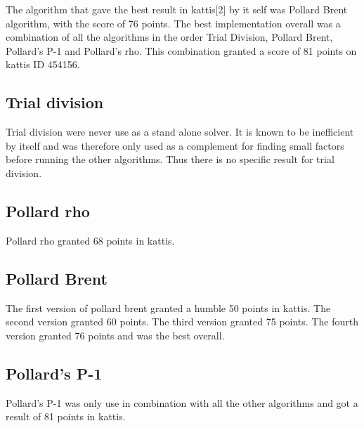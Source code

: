 The algorithm that gave the best result in kattis[2] by it self was Pollard Brent algorithm, with the score of 76 points. The best implementation overall was a combination of all the algorithms in the order Trial Division, Pollard Brent, Pollard’s P-1 and Pollard’s rho. This combination granted a score of 81 points on kattis ID 454156.

\subsection{Trial division}

Trial division were never use as a stand alone solver. It is known to be inefficient by itself and was therefore only used as a complement for finding small factors before running the other algorithms. Thus there is no specific result for trial division.

\subsection{Pollard rho}

Pollard rho granted 68 points in kattis.

\subsection{Pollard Brent}

The first version of pollard brent granted a humble 50 points in kattis. The second version granted 60 points. The third version granted 75 points. The fourth version granted 76 points and was the best overall.

\subsection{Pollard's P-1}

Pollard’s P-1 was only use in combination with all the other algorithms and got a result of 81 points in kattis.

